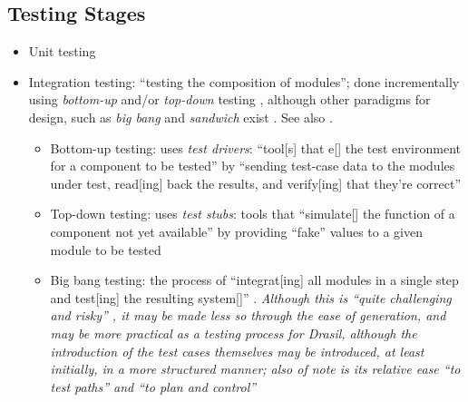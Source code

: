 \subsection{Testing Stages}
\begin{itemize}
    \item Unit testing
    \item Integration testing: ``testing the composition of modules'';
          done incrementally using \emph{bottom-up} and/or
          \emph{top-down} testing \citep[pp.~438-439]{vanVliet2000},
          although other paradigms for design, such as \emph{big bang} and
          \emph{sandwich} exist \citep[p.~489]{PetersAndPedrycz2000}.
          See also \citep[p.~109]{Patton2006}.
          \begin{itemize}
              \item Bottom-up testing: uses \emph{test drivers}: ``tool[s]
                    that  e[] the test environment for a component to
                    be tested'' \citep[p.~410]{vanVliet2000} by
                    ``sending test-case data to the modules under test,
                    read[ing] back the results, and verify[ing] that
                    they're correct'' \citep[p.~109]{Patton2006}
              \item Top-down testing: uses \emph{test stubs}: tools that
                    ``simulate[] the function of a component not yet
                    available'' \citep[p.~410]{vanVliet2000} by
                    providing ``fake'' values to a given module to be
                    tested \citep[p.~110]{Patton2006}
              \item Big bang testing: the process of ``integrat[ing] all
                    modules in a single step and test[ing] the resulting
                    system[]'' \citep[p.~489]{PetersAndPedrycz2000}.
                    \emph{Although this is ``quite challenging and risky''
                        \citep[p.~489]{PetersAndPedrycz2000}, it may be
                        made less so through the ease of generation,
                        and may be more practical as a testing process
                        for Drasil, although the introduction of the
                        test cases themselves may be introduced, at least
                        initially, in a more structured manner; also of
                        note is its relative ease ``to test paths'' and
                        ``to plan and control''
                        \citep[p.~490]{PetersAndPedrycz2000}
                        }

\end{itemize}
\end{itemize}

